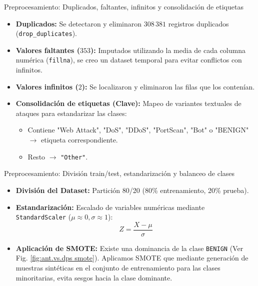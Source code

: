\documentclass{beamer}
\begin{document}
\begin{frame}{Preprocesamiento: Duplicados, faltantes, infinitos y consolidación de etiquetas}
    \begin{itemize}
        \item \textbf{Duplicados:} Se detectaron y eliminaron $308\,381$ registros duplicados (\texttt{drop\_duplicates}).
        
        \item \textbf{Valores faltantes ($353$):} Imputados utilizando la media de cada columna numérica (\texttt{fillna}), se creo un dataset temporal para evitar conflictos con infinitos.
        
        \item \textbf{Valores infinitos ($2$):} Se localizaron y eliminaron las filas que los contenían.
        
        \item \textbf{Consolidación de etiquetas (Clave):} Mapeo de variantes textuales de ataques para estandarizar las clases:
        
        \begin{itemize}
            \item Contiene "Web Attack", "DoS", "DDoS", "PortScan", "Bot" o "BENIGN" $\to$ etiqueta correspondiente.
            
            \item Resto $\to$ \texttt{"Other"}.
        \end{itemize}
    \end{itemize}
\end{frame}


\begin{frame}{Preprocesamiento: División train/test, estandarización y balanceo de clases}
    \begin{itemize}
        \item \textbf{División del Dataset:} Partición 80/20 (80\% entrenamiento, 20\% prueba).
        
        \item \textbf{Estandarización:} Escalado de variables numéricas mediante \texttt{StandardScaler} ($\mu \approx 0, \sigma \approx 1$):
        $$Z = \frac{X - \mu}{\sigma}$$
        
        \item \textbf{Aplicación de SMOTE:} Existe una dominancia de la clase \texttt{BENIGN} (Ver Fig. \ref{fig:ant.vs.dps smote}). Aplicamos SMOTE que mediante generación de muestras sintéticas en el conjunto de entrenamiento para las clases minoritarias, evita sesgos hacia la clase dominante.
    \end{itemize}
\end{frame}
\end{document}
